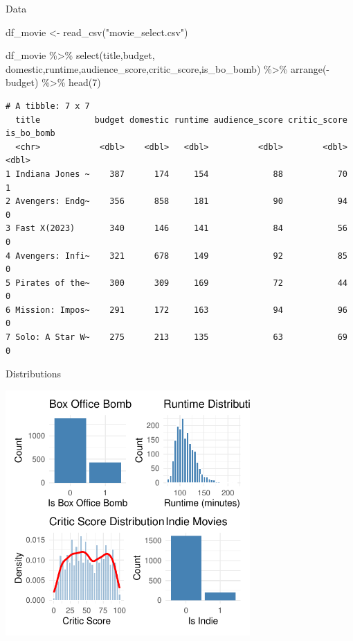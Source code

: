 \documentclass[
  10pt,
  ignorenonframetext,
]{beamer}
\newenvironment{Shaded}{\begin{snugshade}}{\end{snugshade}}
\newcommand{\DecValTok}[1]{\textcolor[rgb]{0.68,0.00,0.00}{#1}}
\newcommand{\FunctionTok}[1]{\textcolor[rgb]{0.28,0.35,0.67}{#1}}
\newcommand{\NormalTok}[1]{\textcolor[rgb]{0.00,0.23,0.31}{#1}}
\newcommand{\OtherTok}[1]{\textcolor[rgb]{0.00,0.23,0.31}{#1}}
\newcommand{\SpecialCharTok}[1]{\textcolor[rgb]{0.37,0.37,0.37}{#1}}
\newcommand{\StringTok}[1]{\textcolor[rgb]{0.13,0.47,0.30}{#1}}
\begin{document}
\begin{frame}[fragile]{Data}
\label{data}
\scriptsize

\begin{Shaded}
\begin{Highlighting}[]
\NormalTok{df\_movie }\OtherTok{\textless{}{-}} \FunctionTok{read\_csv}\NormalTok{(}\StringTok{"movie\_select.csv"}\NormalTok{) }

\NormalTok{df\_movie }\SpecialCharTok{\%\textgreater{}\%} 
  \FunctionTok{select}\NormalTok{(title,budget, domestic,runtime,audience\_score,critic\_score,is\_bo\_bomb) }\SpecialCharTok{\%\textgreater{}\%} 
  \FunctionTok{arrange}\NormalTok{(}\SpecialCharTok{{-}}\NormalTok{budget) }\SpecialCharTok{\%\textgreater{}\%} \FunctionTok{head}\NormalTok{(}\DecValTok{7}\NormalTok{)}
\end{Highlighting}
\end{Shaded}

\begin{verbatim}
# A tibble: 7 x 7
  title           budget domestic runtime audience_score critic_score is_bo_bomb
  <chr>            <dbl>    <dbl>   <dbl>          <dbl>        <dbl>      <dbl>
1 Indiana Jones ~    387      174     154             88           70          1
2 Avengers: Endg~    356      858     181             90           94          0
3 Fast X(2023)       340      146     141             84           56          0
4 Avengers: Infi~    321      678     149             92           85          0
5 Pirates of the~    300      309     169             72           44          0
6 Mission: Impos~    291      172     163             94           96          0
7 Solo: A Star W~    275      213     135             63           69          0
\end{verbatim}
\end{frame}

\begin{frame}{Distributions}
\label{distributions}
\begin{center}
\includegraphics[width=0.7\textwidth,height=\textheight]{logit_files/figure-beamer/unnamed-chunk-6-1.pdf}
\end{center}
\end{frame}
\end{document}
